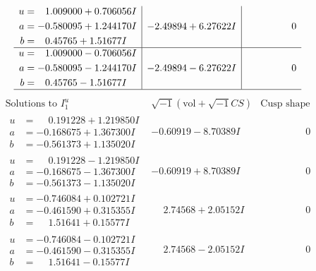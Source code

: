 \documentclass[1p]{elsarticle_modified}
\theoremstyle{definition}
\newcommand{\I}{\sqrt{-1}}
\begin{document}
$$\begin{array}{c|c|c}
\begin{aligned}
u &= \phantom{-}1.009000 + 0.706056 I \\
a &= -0.580095 + 1.244170 I \\
b &= \phantom{-}0.45765 + 1.51677 I\end{aligned}
 & -2.49894 + 6.27622 I & \phantom{-0.000000 } 0 \\ \hline\begin{aligned}
u &= \phantom{-}1.009000 - 0.706056 I \\
a &= -0.580095 - 1.244170 I \\
b &= \phantom{-}0.45765 - 1.51677 I\end{aligned}
 & -2.49894 - 6.27622 I & \phantom{-0.000000 } 0\\
 \hline 
 \end{array}$$\newpage$$\begin{array}{c|c|c}  
\text{Solutions to }I^u_{1}& \I (\text{vol} + \sqrt{-1}CS) & \text{Cusp shape}\\
 \hline 
\begin{aligned}
u &= \phantom{-}0.191228 + 1.219850 I \\
a &= -0.168675 + 1.367300 I \\
b &= -0.561373 + 1.135020 I\end{aligned}
 & -0.60919 - 8.70389 I & \phantom{-0.000000 } 0 \\ \hline\begin{aligned}
u &= \phantom{-}0.191228 - 1.219850 I \\
a &= -0.168675 - 1.367300 I \\
b &= -0.561373 - 1.135020 I\end{aligned}
 & -0.60919 + 8.70389 I & \phantom{-0.000000 } 0 \\ \hline\begin{aligned}
u &= -0.746084 + 0.102721 I \\
a &= -0.461590 + 0.315355 I \\
b &= \phantom{-}1.51641 + 0.15577 I\end{aligned}
 & \phantom{-}2.74568 + 2.05152 I & \phantom{-0.000000 } 0 \\ \hline\begin{aligned}
u &= -0.746084 - 0.102721 I \\
a &= -0.461590 - 0.315355 I \\
b &= \phantom{-}1.51641 - 0.15577 I\end{aligned}
 & \phantom{-}2.74568 - 2.05152 I & \phantom{-0.000000 } 0 \\ \hline\begin{aligned}

\end{aligned}
\end{array}$$
\end{document}
